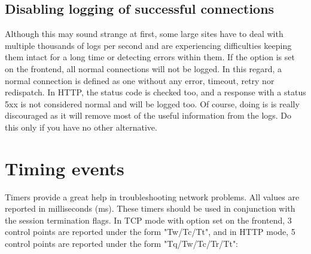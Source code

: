 \subsection{Disabling logging of successful connections}
\label{subsec:disabling_logging_successful_connections}

Although this may sound strange at first, some large sites have to deal with
multiple thousands of logs per second and are experiencing difficulties keeping
them intact for a long time or detecting errors within them. If the option
 is set on the frontend, all normal connections will not be
logged. In this regard, a normal connection is defined as one without any
error, timeout, retry nor redispatch. In HTTP, the status code is checked too,
and a response with a status 5xx is not considered normal and will be logged
too. Of course, doing is is really discouraged as it will remove most of the
useful information from the logs. Do this only if you have no other
alternative.

\section{Timing events}
\label{sec:timing_events}

Timers provide a great help in troubleshooting network problems. All values are
reported in milliseconds (ms). These timers should be used in conjunction with
the session termination flags. In TCP mode with option  set on the
frontend, 3 control points are reported under the form "Tw/Tc/Tt", and in HTTP
mode, 5 control points are reported under the form "Tq/Tw/Tc/Tr/Tt":

